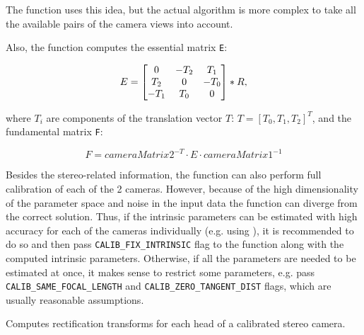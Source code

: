 The function uses this idea, but the actual algorithm is more complex to take all the available pairs of the camera views into account.

Also, the function computes the essential matrix \texttt{E}:

\[
E=
\begin{bmatrix} 0 & -T_2 & T_1\\ T_2 & 0 & -T_0\\ -T_1 & T_0 & 0 \end{bmatrix}
*R,
\]

where $T_i$ are components of the translation vector $T:\,T=[T_0, T_1, T_2]^T$,
and the fundamental matrix \texttt{F}:

\[F = cameraMatrix2^{-T} \cdot E \cdot cameraMatrix1^{-1}\]

Besides the stereo-related information, the function can also perform full calibration of each of the 2 cameras. However, because of the high dimensionality of the parameter space and noise in the input data the function can diverge from the correct solution. Thus, if the intrinsic parameters can be estimated with high accuracy for each of the cameras individually (e.g. using ), it is recommended to do so and then pass \texttt{CALIB\_FIX\_INTRINSIC} flag to the function along with the computed intrinsic parameters. Otherwise, if all the parameters are needed to be estimated at once, it makes sense to restrict some parameters, e.g. pass \texttt{CALIB\_SAME\_FOCAL\_LENGTH} and \texttt{CALIB\_ZERO\_TANGENT\_DIST} flags, which are usually reasonable assumptions. 


\label{stereoRectify}
Computes rectification transforms for each head of a calibrated stereo camera.

